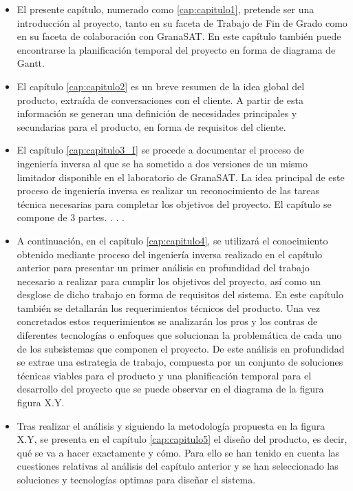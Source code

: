 \begin{itemize}
    \item El presente capítulo, numerado como \ref{cap:capitulo1}, pretende ser una introducción al proyecto, tanto en su faceta de Trabajo de Fin de Grado como en su faceta de colaboración con GranaSAT. En este capítulo también puede encontrarse la planificación temporal del proyecto en forma de diagrama de Gantt.

    \item El capítulo \ref{cap:capitulo2} es un breve resumen de la idea global del producto, extraída de conversaciones con el cliente. A partir de esta información se generan una definición de necesidades principales y secundarias para el producto, en forma de requisitos del cliente.

    \item El capítulo \ref{cap:capitulo3_I} se procede a documentar el proceso de ingeniería inversa al que se ha sometido a dos versiones de un mismo limitador disponible en el laboratorio de GranaSAT. La idea principal de este proceso de ingeniería inversa es realizar un reconocimiento de las tareas técnica necesarias para completar los objetivos del proyecto. El capítulo se compone de 3 partes.
    \subitem {}.
	\subitem {}.
	\subitem {}.

    \item A continuación, en el capítulo \ref{cap:capitulo4}, se utilizará el conocimiento obtenido mediante proceso del ingeniería inversa realizado en el capítulo anterior para presentar un primer análisis en profundidad del trabajo necesario a realizar para cumplir los objetivos del proyecto, así como un desglose de dicho trabajo en forma de requisitos del sistema. En este capítulo también se detallarán los requerimientos técnicos del producto. Una vez concretados estos requerimientos se analizarán los pros y los contras de diferentes tecnologías o enfoques que solucionan la problemática de cada uno de los subsistemas que componen el proyecto. De este análisis en profundidad se extrae una estrategia de trabajo, compuesta por un conjunto de soluciones técnicas viables para el producto y una planificación temporal para el desarrollo del proyecto que se puede observar en el diagrama de la figura figura X.Y.

    \item Tras realizar el análisis y siguiendo la metodología propuesta en la figura X.Y, se presenta en el capítulo \ref{cap:capitulo5} el diseño del producto, es decir, qué se va a hacer exactamente y cómo. Para ello se han tenido en cuenta las cuestiones relativas al análisis del capítulo anterior y se han seleccionado las soluciones y tecnologías optimas para diseñar el sistema.


\end{itemize}
